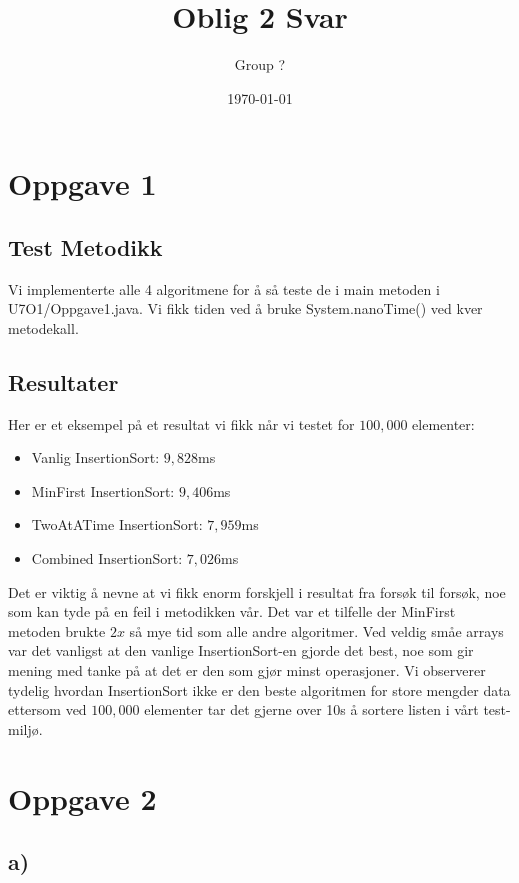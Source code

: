 \documentclass[12pt]{article}
\title{Oblig 2 Svar}
\author{Group ?}
\date{\today}
\begin{document}
\maketitle

\section*{Oppgave 1}

\subsection*{Test Metodikk}
Vi implementerte alle 4 algoritmene for å så teste de i main metoden i U7O1/Oppgave1.java. 
Vi fikk tiden ved å bruke System.nanoTime() ved kver metodekall.

\subsection*{Resultater}
Her er et eksempel på et resultat vi fikk når vi testet for $100,000$ elementer:
\begin{itemize}
    \item Vanlig InsertionSort: $9,828$ms
    \item MinFirst InsertionSort: $9,406$ms
    \item TwoAtATime InsertionSort: $7,959$ms 
    \item Combined InsertionSort: $7,026$ms
\end{itemize}
Det er viktig å nevne at vi fikk enorm forskjell i resultat fra forsøk til forsøk, noe som kan tyde på en feil i metodikken vår. Det var et tilfelle der MinFirst metoden brukte $2x$ så mye tid som alle andre algoritmer. Ved veldig småe arrays var det vanligst at den vanlige InsertionSort-en gjorde det best, noe som gir mening med tanke på at det er den som gjør minst operasjoner.
Vi observerer tydelig hvordan InsertionSort ikke er den beste algoritmen for store mengder data ettersom ved $100,000$ elementer tar det gjerne over 10s å sortere listen i vårt test-miljø.

\section*{Oppgave 2}

\subsection*{a)}
\end{document}
